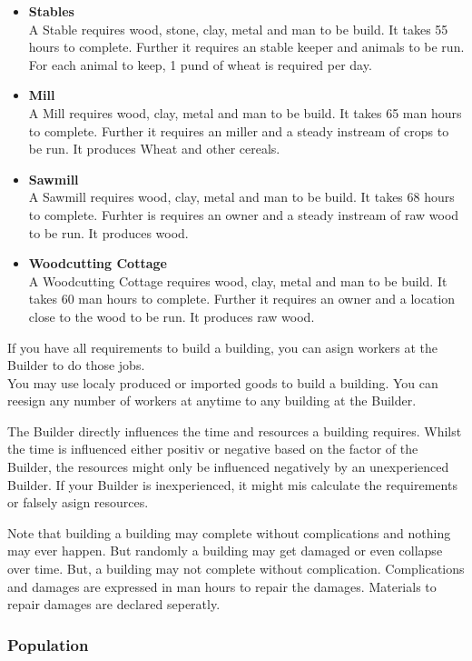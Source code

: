 \documentclass[10pt,twoside,twocolumn,openany]{book}
\begin{document}
\begin{itemize}
\item \textbf{Stables} \\ A Stable requires wood, stone, clay, metal and man to be build. It takes 55 hours to complete. Further it requires an stable keeper and animals to be run. For each animal to keep, 1 pund of wheat is required per day.
\item \textbf{Mill} \\ A Mill requires wood, clay, metal and man to be build. It takes 65 man hours to complete. Further it requires an miller and a steady instream of crops to be run. It produces Wheat and other cereals.
\item \textbf{Sawmill} \\ A Sawmill requires wood, clay, metal and man to be build. It takes 68 hours to complete. Furhter is requires an owner and a steady instream of raw wood to be run. It produces wood.
\item \textbf{Woodcutting Cottage} \\ A Woodcutting Cottage requires wood, clay, metal and man to be build. It takes 60 man hours to complete. Further it requires an owner and a location close to the wood to be run. It produces raw wood.
\end{itemize}

If you have all requirements to build a building, you can asign workers at the Builder to do those jobs.\\
You may use localy produced or imported goods to build a building. You can reesign any number of workers at anytime to any building at the Builder.

The Builder directly influences the time and resources a building requires. Whilst the time is influenced either positiv or negative based on the factor of the Builder, the resources might only be influenced negatively by an unexperienced Builder. If your Builder is inexperienced, it might mis calculate the requirements or falsely asign resources.

Note that building a building may complete without complications and nothing may ever happen. But randomly a building may get damaged or even collapse over time. But, a building may not complete without complication. Complications and damages are expressed in man hours to repair the damages. Materials to repair damages are declared seperatly.

\subsubsection{Population}
\end{document}
